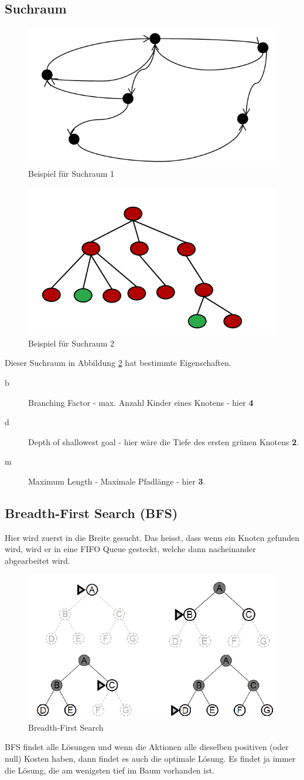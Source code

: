 \subsection{Suchraum}
\begin{figure} [h!]
	\centering
	\includegraphics[width=0.2\linewidth]{fig/search_space}
	\caption{Beispiel für Suchraum 1}
	\label{fig:search_space}
\end{figure}

\begin{figure} [h!]
	\centering
	\includegraphics[width=0.2\linewidth]{fig/suchraum}
	\caption{Beispiel für Suchraum 2}
	\label{fig:suchraum}
\end{figure}

Dieser Suchraum in Abbildung \ref{fig:suchraum} hat bestimmte Eigenschaften.
\begin{description}
	\item[b] Branching Factor - max. Anzahl Kinder eines Knotens - hier \textbf{4}
	\item[d] Depth of shallowest goal - hier wäre die Tiefe des ersten grünen Knotens \textbf{2}.
	\item[m] Maximum Length - Maximale Pfadlänge - hier \textbf{3}.
\end{description}

\subsection{Breadth-First Search (BFS)}
Hier wird zuerst in die Breite gesucht. Das heisst, dass wenn ein Knoten gefunden wird, wird er in eine FIFO Queue gesteckt, welche dann nacheinander abgearbeitet wird.
\begin{figure} [h!]
	\centering
	\includegraphics[width=0.4\linewidth]{fig/bfs_search}
	\caption{Breadth-First Search}
	\label{fig:bfs}
\end{figure}
BFS findet alle Lösungen und wenn die Aktionen alle dieselben positiven (oder null) Kosten haben, dann findet es auch die optimale Lösung. Es findet ja immer die Lösung, die am wenigsten tief im Baum vorhanden ist.
